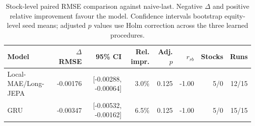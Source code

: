 \begin{table}[t]
\centering
\small
\caption{Stock-level paired RMSE comparison against naive-last. Negative $\Delta$ and positive relative improvement favour the model. Confidence intervals bootstrap equity-level seed means; adjusted $p$ values use Holm correction across the three learned procedures.}
\label{tab:paired_rmse_naive}
\begin{tabular}{lrrrrrrr}
\toprule
Model & $\Delta$RMSE & 95\% CI & Rel. impr. & Adj. $p$ & $r_{rb}$ & Stocks & Runs \\
\midrule
Local-MAE/Long-JEPA & -0.00176 & [-0.00288, -0.00064] & 3.0\% & 0.125 & -1.00 & 5/0 & 12/15 \\
GRU & -0.00347 & [-0.00532, -0.00162] & 6.5\% & 0.125 & -1.00 & 5/0 & 15/15 \\
\bottomrule
\end{tabular}
\end{table}

